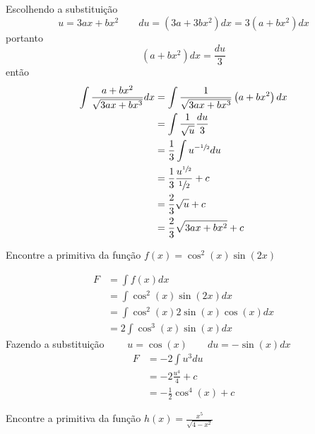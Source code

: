 \documentclass[a4paper,12pt,fleqn]{article}
\begin{document}
\begin{answer}
  Escolhendo a substituição
  \[
    u = 3ax+bx^2
    \qquad
    du = \left(3a + 3bx^2\right) dx = 3\left(a + bx^2\right) dx
  \]
  portanto
  \[
    \left(a+bx^2\right)dx = \frac{du}{3}
  \]
  então
  \begin{align*}
    \int \frac{a+bx^2}{\sqrt{3ax+bx^3}} dx
    & = \int \frac{1}{\sqrt{3ax+bx^3}} \left(a+bx^2\right)dx \\
    & = \int \frac{1}{\sqrt{u}} \frac{du}{3} \\
    & = \frac{1}{3} \int u^{-\sfrac{1}{2}} du \\
    & = \frac{1}{3} \frac{u^{\sfrac{1}{2}}}{\sfrac{1}{2}} + c \\
    & = \frac{2}{3} \sqrt{u} + c \\
    & = \frac{2}{3} \sqrt{3ax+bx^2} + c
  \end{align*}
\end{answer}

Encontre a primitiva da função  \( f(x) = \cos^2(x)\sin(2x)  \)

\begin{answer}
  \begin{align*}
    F
    & = \int f(x) dx \\
    & = \int \cos^2(x)\sin(2x) dx \\
    & = \int \cos^2(x)2\sin(x)\cos(x) dx \\
    & = 2\int \cos^3(x)\sin(x) dx
  \end{align*}
  Fazendo a substituição
  \(
    \qquad
    u = \cos(x)
    \qquad
    du = -\sin(x)dx
  \)
  \begin{align*}
    F
    & = -2\int u^3 du \\
    & = -2 \frac{u^4}{4} + c \\
    & = -\frac{1}{2}\cos^4(x) + c
  \end{align*}
\end{answer}


Encontre a primitiva da função \(h(x) = \frac{x^5}{\sqrt{4-x^2}} \)
\end{document}
